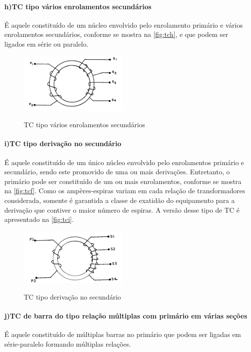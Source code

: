\documentclass[a5paper,english,spanish,brazil]{ufsc-thesis}
\begin{document}
				\paragraph*{h)\indent TC tipo vários enrolamentos secundários}
					É aquele constituído de um núcleo envolvido pelo enrolamento primário e vários enrolamentos secundários, conforme se mostra na \autoref{fig:tch}, e que podem ser ligados em série ou paralelo.
					\begin{figure}[htb]
						\caption{TC tipo vários enrolamentos secundários}
						\centering
						\includegraphics[width=5.4cm]{TC(8).png}
						\label{fig:tch}
					\end{figure}
				\paragraph*{i)\indent TC tipo derivação no secundário}
					É aquele constituído de um único núcleo envolvido pelo enrolamentos primário e secundário, sendo este promovido de uma ou mais derivações. Entretanto, o primário pode ser constituído de um ou mais enrolamentos, conforme se mostra na \autoref{fig:tcf}. Como os ampères-espiras variam em cada relação de transformadores considerada, somente é garantida a classe de  exatidão do equipamento para a derivação que contiver o maior número de espiras. A versão desse tipo de TC é apresentado na \autoref{fig:tci}.  
					\begin{figure}[htb]
						\caption{TC tipo derivação no secundário}
						\centering
						\includegraphics[width=5.4cm]{TC(9).png}
						\label{fig:tci}
					\end{figure}
				\paragraph*{j)\indent TC de barra do tipo relação múltiplas com primário em várias seções}
					É aquele constituído de múltiplas barras no primário que podem ser ligadas em série-paralelo formando múltiplas relações.
			
\end{document}
